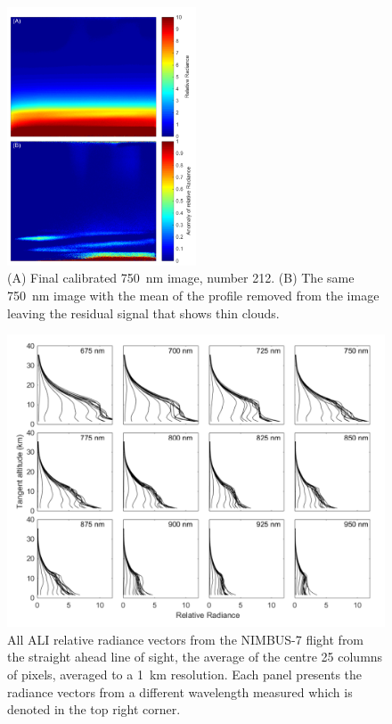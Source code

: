 \documentclass[12pt]{article}
\begin{document}
\begin{figure}
    \begin{subfigure}[t]{0\textwidth}
        \label{fig:AfterImagesHorizontalDependance:a}
    \end{subfigure}
    \begin{subfigure}[t]{0\textwidth}
         \label{fig:AfterImagesHorizontalDependance:b}
    \end{subfigure}
    \includegraphics[width=0.50\textwidth]{./Images/5-2-AfterImage.pdf}
    \caption{(A) Final calibrated 750~nm image, number 212. (B) The same 750~nm image with the mean of the profile removed from the image leaving the residual signal that shows 
thin clouds.}
    \label{fig:AfterImagesHorizontalDependance}
\end{figure}

\clearpage

\begin{figure}
\includegraphics[width=1.0\textwidth]{./Images/5-2-AliRadianceVectors.pdf}
    \caption{All ALI relative radiance vectors from the NIMBUS-7 flight from the straight ahead line of sight, the average of the centre 25 columns of pixels, averaged to a 1~km 
resolution. Each panel presents the radiance vectors from a different wavelength measured which is denoted in the top right corner.}
    \label{fig:AliRadiancesVectors}
\end{figure}
\end{document}
